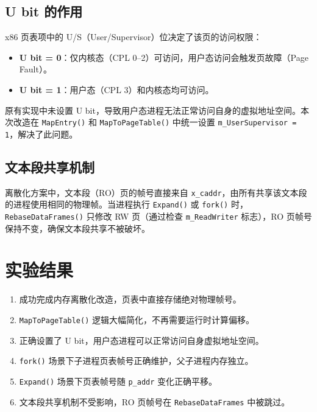 \documentclass[12pt]{article}
\begin{document}
\subsection{U bit 的作用}

x86 页表项中的 U/S（User/Supervisor）位决定了该页的访问权限：
\begin{itemize}
    \item \textbf{U bit = 0}：仅内核态（CPL 0--2）可访问，用户态访问会触发页故障（Page Fault）。
    \item \textbf{U bit = 1}：用户态（CPL 3）和内核态均可访问。
\end{itemize}

原有实现中未设置 U bit，导致用户态进程无法正常访问自身的虚拟地址空间。本次改造在 \texttt{MapEntry()} 和 \texttt{MapToPageTable()} 中统一设置 \texttt{m\_UserSupervisor = 1}，解决了此问题。

\subsection{文本段共享机制}

离散化方案中，文本段（RO）页的帧号直接来自 \texttt{x\_caddr}，由所有共享该文本段的进程使用相同的物理帧。当进程执行 \texttt{Expand()} 或 \texttt{fork()} 时，\texttt{RebaseDataFrames()} 只修改 RW 页（通过检查 \texttt{m\_ReadWriter} 标志），RO 页帧号保持不变，确保文本段共享不被破坏。

\section{实验结果}

\begin{enumerate}
    \item 成功完成内存离散化改造，页表中直接存储绝对物理帧号。
    \item \texttt{MapToPageTable()} 逻辑大幅简化，不再需要运行时计算偏移。
    \item 正确设置了 U bit，用户态进程可以正常访问自身虚拟地址空间。
    \item \texttt{fork()} 场景下子进程页表帧号正确维护，父子进程内存独立。
    \item \texttt{Expand()} 场景下页表帧号随 \texttt{p\_addr} 变化正确平移。
    \item 文本段共享机制不受影响，RO 页帧号在 \texttt{RebaseDataFrames} 中被跳过。
\end{enumerate}
\end{document}
